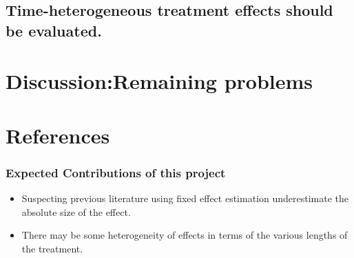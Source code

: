 \documentclass{beamer}
\begin{document}
    \subsection{Time-heterogeneous treatment effects should be evaluated.}
\section{Discussion:Remaining problems}
\section{References}

\begin{frame}\frametitle{Expected Contributions of this project}
    \begin{itemize}
        \item Suspecting previous literature using fixed effect estimation underestimate the absolute size of the effect. 
        \item There may be some heterogeneity of effects in terms of the various lengths of the treatment.
    \end{itemize}
\end{frame}
\end{document}
